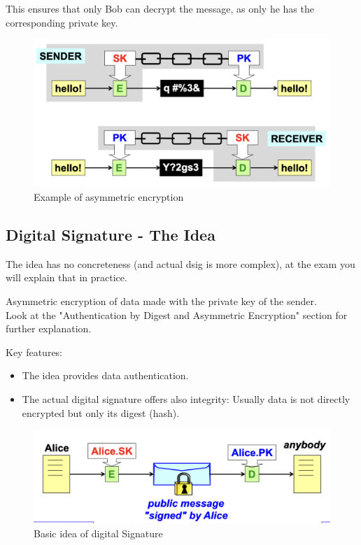 This ensures that only Bob can decrypt the message, as only he has the corresponding private key.

\begin{figure}[H]
    \centering
    \includegraphics[width=0.8\linewidth]{Images/Cryptography/asymmCrypto.png}
    \caption{Example of asymmetric encryption}
\end{figure}


\subsection{Digital Signature - The Idea}
\begin{tcolorbox}[colback=red!10!white, colframe=red!70!black, coltitle=white, title=Beware]
The idea has no concreteness (and actual dsig is more complex), at the exam you will explain that in practice.
\end{tcolorbox}
\begin{center}
Asymmetric encryption of data made with the private key of the sender. \\ 
Look at the "Authentication by Digest and Asymmetric Encryption" section for further explanation.
\end{center}

Key features:
\begin{itemize}
    \item The idea provides data authentication.
    \item The actual digital signature offers also integrity: Usually data is not directly encrypted but only its digest (hash).
\end{itemize}


\begin{figure}[H]
    \centering
    \includegraphics[width=0.8\linewidth]{Images/Cryptography/basic_digital_signature.png}
    \caption{Basic idea of digital Signature}
\end{figure}

